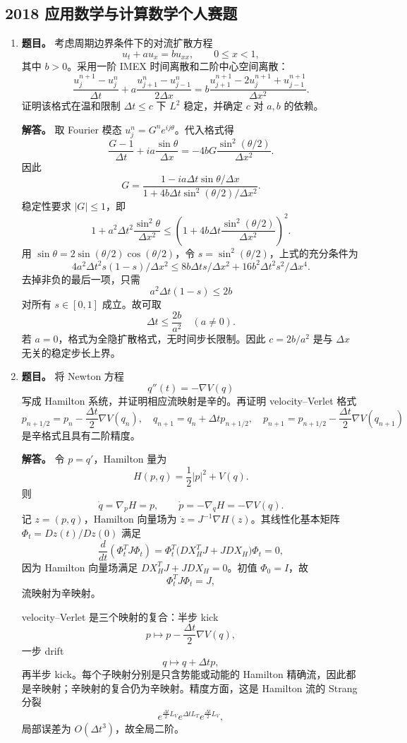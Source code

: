 ﻿\documentclass[UTF8,12pt]{ctexart}
\begin{document}
\subsection{2018 应用数学与计算数学个人赛题}
\begin{enumerate}[label=\textbf{\arabic*.},leftmargin=2.2em]
\item \textbf{题目。} 考虑周期边界条件下的对流扩散方程
\[
u_t+a u_x=b u_{xx},\qquad 0\le x<1,
\]
其中 \(b>0\)。采用一阶 IMEX 时间离散和二阶中心空间离散：
\[
\frac{u_j^{n+1}-u_j^n}{\Delta t}
+a\frac{u_{j+1}^n-u_{j-1}^n}{2\Delta x}
=b\frac{u_{j+1}^{n+1}-2u_j^{n+1}+u_{j-1}^{n+1}}{\Delta x^2}.
\]
证明该格式在温和限制 \(\Delta t\le c\) 下 \(L^2\) 稳定，并确定 \(c\) 对 \(a,b\) 的依赖。

\textbf{解答。} 取 Fourier 模态 \(u_j^n=G^n e^{ij\theta}\)。代入格式得
\[
\frac{G-1}{\Delta t}+ia\frac{\sin\theta}{\Delta x}
=-4bG\frac{\sin^2(\theta/2)}{\Delta x^2}.
\]
因此
\[
G=\frac{1-i a\Delta t\sin\theta/\Delta x}
{1+4b\Delta t\sin^2(\theta/2)/\Delta x^2}.
\]
稳定性要求 \(|G|\le1\)，即
\[
1+a^2\Delta t^2\frac{\sin^2\theta}{\Delta x^2}
\le
\left(1+4b\Delta t\frac{\sin^2(\theta/2)}{\Delta x^2}\right)^2.
\]
用 \(\sin\theta=2\sin(\theta/2)\cos(\theta/2)\)，令 \(s=\sin^2(\theta/2)\)，上式的充分条件为
\[
4a^2\Delta t^2s(1-s)/\Delta x^2
\le 8b\Delta t s/\Delta x^2+16b^2\Delta t^2s^2/\Delta x^4.
\]
去掉非负的最后一项，只需
\[
a^2\Delta t(1-s)\le2b
\]
对所有 \(s\in[0,1]\) 成立。故可取
\[
\Delta t\le \frac{2b}{a^2}\quad(a\ne0).
\]
若 \(a=0\)，格式为全隐扩散格式，无时间步长限制。因此 \(c=2b/a^2\) 是与 \(\Delta x\) 无关的稳定步长上界。

\item \textbf{题目。} 将 Newton 方程
\[
q''(t)=-\nabla V(q)
\]
写成 Hamilton 系统，并证明相应流映射是辛的。再证明 velocity--Verlet 格式
\[
p_{n+1/2}=p_n-\frac{\Delta t}{2}\nabla V(q_n),
\quad
q_{n+1}=q_n+\Delta t p_{n+1/2},
\quad
p_{n+1}=p_{n+1/2}-\frac{\Delta t}{2}\nabla V(q_{n+1})
\]
是辛格式且具有二阶精度。

\textbf{解答。} 令 \(p=q'\)，Hamilton 量为
\[
H(p,q)=\frac12|p|^2+V(q).
\]
则
\[
\dot q=\nabla_pH=p,
\qquad
\dot p=-\nabla_qH=-\nabla V(q).
\]
记 \(z=(p,q)\)，Hamilton 向量场为 \(\dot z=J^{-1}\nabla H(z)\)。其线性化基本矩阵 \(\Phi_t=Dz(t)/Dz(0)\) 满足
\[
\frac{d}{dt}(\Phi_t^TJ\Phi_t)
=\Phi_t^T\bigl(DX_H^TJ+JDX_H\bigr)\Phi_t=0,
\]
因为 Hamilton 向量场满足 \(DX_H^TJ+JDX_H=0\)。初值 \(\Phi_0=I\)，故
\[
\Phi_t^TJ\Phi_t=J,
\]
流映射为辛映射。

velocity--Verlet 是三个映射的复合：半步 kick
\[
p\mapsto p-\frac{\Delta t}{2}\nabla V(q),
\]
一步 drift
\[
q\mapsto q+\Delta t p,
\]
再半步 kick。每个子映射分别是只含势能或动能的 Hamilton 精确流，因此都是辛映射；辛映射的复合仍为辛映射。精度方面，这是 Hamilton 流的 Strang 分裂
\[
e^{\frac{\Delta t}{2}L_V}e^{\Delta t L_T}e^{\frac{\Delta t}{2}L_V},
\]
局部误差为 \(O(\Delta t^3)\)，故全局二阶。


\end{enumerate}
\end{document}
